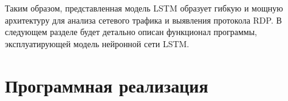 \documentclass[bachelor, och, coursework]{SCWorks}
\begin{document}
Таким образом, представленная модель LSTM образует гибкую и мощную архитектуру для анализа сетевого трафика и выявления протокола RDP. В следующем 
разделе будет детально описан функционал программы, эксплуатирующей модель нейронной сети LSTM. 
  

\section{Программная реализация}


  


\end{document}
